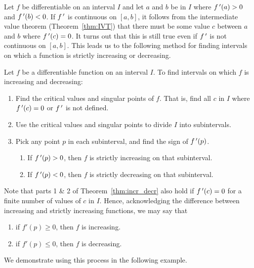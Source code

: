 Let $f$ be differentiable on an interval $I$ and let $a$ and $b$ be in $I$ where $f\,'(a)>0$ and $f\,'(b)<0$. If $f\,'$ is continuous on $[a,b]$, it follows from the intermediate value theorem (Theorem~\ref{thm:IVT}) that there must be some value $c$ between $a$ and $b$ where $f\,'(c) = 0$. It turns out that this is still true even if $f\,'$ is not continuous on $[a,b]$. This leads us to the following method for finding intervals on which a function is strictly increasing or decreasing.


Let $f$ be a differentiable function on an interval $I$. To find intervals on which $f$ is increasing and decreasing:
\begin{enumerate}
\item	Find the critical values and singular points of $f$. That is, find all $c$ in $I$ where $f\,'(c) = 0$ or $f\,'$ is not defined.
\item		Use the critical values and singular points to divide $I$ into subintervals.
\item		Pick any point $p$ in each subinterval, and find the sign of $f\,'(p)$. 
		\begin{enumerate}
		\item		If $f\,'(p)>0$, then $f$ is strictly increasing on that subinterval.
		\item		If $f\,'(p)<0$, then $f$ is strictly decreasing on that subinterval.
		\end{enumerate}
\end{enumerate}


Note that parts 1 \& 2 of Theorem~\ref{thm:incr_decr} also hold if $f\,'(c) = 0$ for a finite number of values of $c$ in $I$.  Hence, acknowledging the difference between increasing and strictly increasing functions, we may say that
\begin{enumerate}
\item if $f'(p)\geq0$, then $f$ is increasing.
\item if $f'(p)\leq0$, then $f$ is decreasing.
\end{enumerate}



We demonstrate using this process in the following example.

